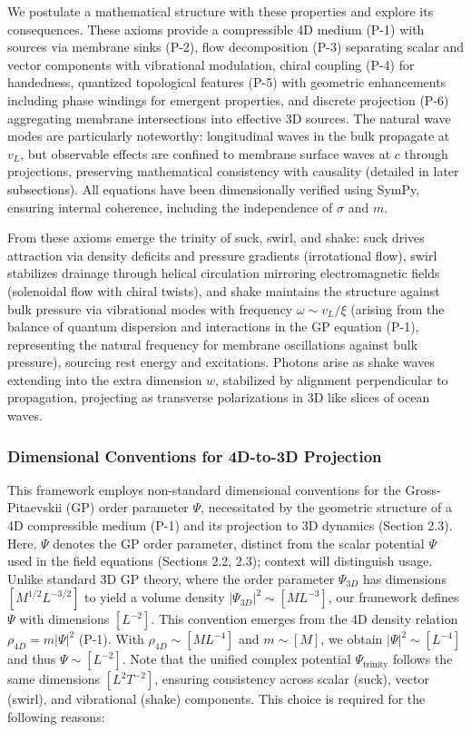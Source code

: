 We postulate a mathematical structure with these properties and explore its consequences. These axioms provide a compressible 4D medium (P-1) with sources via membrane sinks (P-2), flow decomposition (P-3) separating scalar and vector components with vibrational modulation, chiral coupling (P-4) for handedness, quantized topological features (P-5) with geometric enhancements including phase windings for emergent properties, and discrete projection (P-6) aggregating membrane intersections into effective 3D sources. The natural wave modes are particularly noteworthy: longitudinal waves in the bulk propagate at $v_L$, but observable effects are confined to membrane surface waves at $c$ through projections, preserving mathematical consistency with causality (detailed in later subsections). All equations have been dimensionally verified using SymPy, ensuring internal coherence, including the independence of $\sigma$ and $m$.

From these axioms emerge the trinity of suck, swirl, and shake: suck drives attraction via density deficits and pressure gradients (irrotational flow), swirl stabilizes drainage through helical circulation mirroring electromagnetic fields (solenoidal flow with chiral twists), and shake maintains the structure against bulk pressure via vibrational modes with frequency $\omega \sim v_L / \xi$ (arising from the balance of quantum dispersion and interactions in the GP equation (P-1), representing the natural frequency for membrane oscillations against bulk pressure), sourcing rest energy and excitations. Photons arise as shake waves extending into the extra dimension $w$, stabilized by alignment perpendicular to propagation, projecting as transverse polarizations in 3D like slices of ocean waves.

\subsubsection{Dimensional Conventions for 4D-to-3D Projection}
\label{subsec:dimensional_conventions}

This framework employs non-standard dimensional conventions for the Gross-Pitaevskii (GP) order parameter $\Psi$, necessitated by the geometric structure of a 4D compressible medium (P-1) and its projection to 3D dynamics (Section 2.3). Here, $\Psi$ denotes the GP order parameter, distinct from the scalar potential $\Psi$ used in the field equations (Sections 2.2, 2.3); context will distinguish usage. Unlike standard 3D GP theory, where the order parameter $\Psi_{3D}$ has dimensions $[M^{1/2} L^{-3/2}]$ to yield a volume density $|\Psi_{3D}|^2 \sim [M L^{-3}]$, our framework defines $\Psi$ with dimensions $[L^{-2}]$. This convention emerges from the 4D density relation $\rho_{4D} = m |\Psi|^2$ (P-1). With $\rho_{4D} \sim [M L^{-4}]$ and $m \sim [M]$, we obtain $|\Psi|^2 \sim [L^{-4}]$ and thus $\Psi \sim [L^{-2}]$. Note that the unified complex potential $\Psi_{\text{trinity}}$ follows the same dimensions $[L^2 T^{-2}]$, ensuring consistency across scalar (suck), vector (swirl), and vibrational (shake) components. This choice is required for the following reasons:

